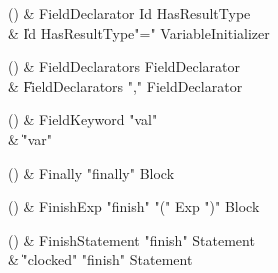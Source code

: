 \begin{bbgrammarappendix}

() & FieldDeclarator \label{prod:FieldDeclarator}  \: Id HasResultType  \\

 &    \| Id HasResultType\opt \xcd"=" VariableInitializer \\

\end{bbgrammarappendix}

\begin{bbgrammarappendix}

() & FieldDeclarators \label{prod:FieldDeclarators}  \: FieldDeclarator  \\

 &    \| FieldDeclarators \xcd"," FieldDeclarator \\

\end{bbgrammarappendix}

\begin{bbgrammarappendix}

() & FieldKeyword \label{prod:FieldKeyword}  \: \xcd"val"  \\

 &    \| \xcd"var" \\

\end{bbgrammarappendix}

\begin{bbgrammarappendix}

() & Finally \label{prod:Finally}  \: \xcd"finally" Block  \\


\end{bbgrammarappendix}

\begin{bbgrammarappendix}

() & FinishExp \label{prod:FinishExp}  \: \xcd"finish" \xcd"(" Exp \xcd")" Block  \\


\end{bbgrammarappendix}

\begin{bbgrammarappendix}

() & FinishStatement \label{prod:FinishStatement}  \: \xcd"finish" Statement  \\

 &    \| \xcd"clocked" \xcd"finish" Statement \\

\end{bbgrammarappendix}

